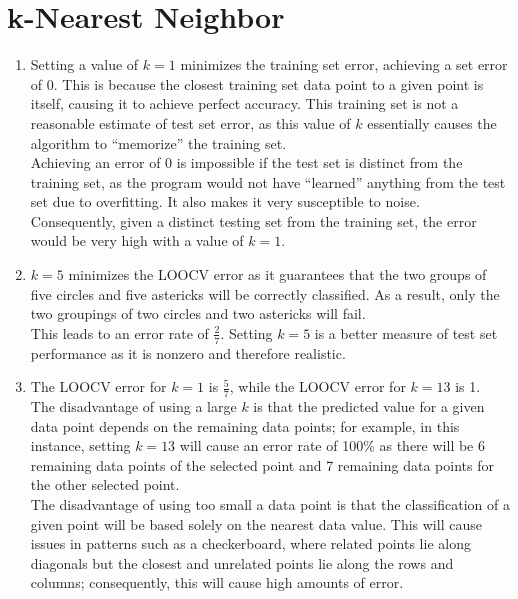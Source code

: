 \documentclass[11pt]{article}
\newcommand{\solution}[1]{{{\color{blue}{\bf Solution:} {#1}}}}
\begin{document}
\section{k-Nearest Neighbor}
\begin{enumerate}
\item
\solution{Setting a value of $k=1$ minimizes the training set error, achieving a set error of 0. This is because the closest training set data point to a given point is itself, causing it to achieve perfect accuracy. This training set is not a reasonable estimate of test set error, as this value of $k$ essentially causes the algorithm to ``memorize'' the training set. \\
Achieving an error of 0 is impossible if the test set is distinct from the training set, as the program would not have ``learned'' anything from the test set due to overfitting. It also makes it very susceptible to noise. \\
Consequently, given a distinct testing set from the training set, the error would be very high with a value of $k=1$.
}
\vspace{1cm}

\item
\solution{ $k=5$ minimizes the LOOCV error as it guarantees that the two groups of five circles and five astericks will be correctly classified. As a result, only the two groupings of two circles and two astericks will fail. \\
This leads to an error rate of $\tfrac{2}{7}$. Setting $k=5$ is a better measure of test set performance as it is nonzero and therefore realistic.
}
\vspace{1cm}

\item
\solution{The LOOCV error for $k=1$ is $\frac{5}{7}$, while the LOOCV error for $k=13$ is 1. \\
The disadvantage of using a large $k$ is that the predicted value for a given data point depends on the remaining data points; for example, in this instance, setting $k=13$ will cause an error rate of 100\% as there will be 6 remaining data points of the selected point and 7 remaining data points for the other selected point.\\
 The disadvantage of using too small a data point is that the classification of a given point will be based solely on the nearest data value. This will cause issues in patterns such as a checkerboard, where related points lie along diagonals but the closest and unrelated points lie along the rows and columns; consequently, this will cause high amounts of error.
}
\end{enumerate}
\newpage
\end{document}

